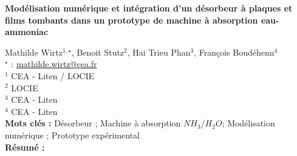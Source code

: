 


    \newpage


%
\begin{flushleft}
\addtocounter{section}{1}
{\Large \textbf{Modélisation numérique et intégration d'un désorbeur à plaques et films tombants dans un prototype de machine à absorption eau-ammoniac}}\label{ref:11}
\end{flushleft}
%
Mathilde Wirtz$^{1,\star}$, Benoit Stutz$^{2}$, Hai Trieu Phan$^{3}$, François Boudéhenn$^{4}$\\[2mm]
$^{\star}$ \Letter : \url{mathilde.wirtz@cea.fr}\\[2mm]
{\footnotesize $^{1}$ CEA - Liten / LOCIE}\\
{\footnotesize $^{2}$ LOCIE}\\
{\footnotesize $^{3}$ CEA  - Liten}\\
{\footnotesize $^{4}$ CEA - Liten}\\
[4mm]
%
\noindent \textbf{Mots clés : } Désorbeur ; Machine à absorption $\unit{NH_3}$/$\unit{H_2O}$; Modélisation numérique ; Prototype expérimental\\[4mm]
%
\noindent \textbf{Résumé : } 

